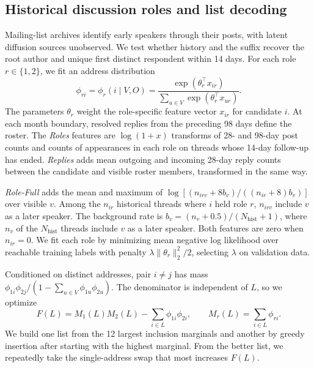 \documentclass[a4paper,runningheads]{llncs}
\begin{document}
\subsection{Historical discussion roles and list decoding}
Mailing-list archives identify early speakers through their posts, with latent diffusion sources unobserved. We test whether history and the suffix recover the root author and unique first distinct respondent within 14 days. For each role $r\in\{1,2\}$, we fit an address distribution
\[
 \phi_{ri}=\phi_r(i\mid V,O)=\frac{\exp(\theta_r^\top x_{ir})}{\sum_{u\in V}\exp(\theta_r^\top x_{ur})}.
\]
The parameters $\theta_r$ weight the role-specific feature vector $x_{ir}$ for candidate $i$. At each month boundary, resolved replies from the preceding 98 days define the roster. The \emph{Roles} features are $\log(1+x)$ transforms of 28- and 98-day post counts and counts of appearances in each role on threads whose 14-day follow-up has ended. \emph{Replies} adds mean outgoing and incoming 28-day reply counts between the candidate and visible roster members, transformed in the same way.

\emph{Role-Full} adds the mean and maximum of $\log[(n_{irv}+8b_v)/((n_{ir}+8)b_v)]$ over visible $v$. Among the $n_{ir}$ historical threads where $i$ held role $r$, $n_{irv}$ include $v$ as a later speaker. The background rate is $b_v=(n_v+0.5)/(N_{\mathrm{hist}}+1)$, where $n_v$ of the $N_{\mathrm{hist}}$ threads include $v$ as a later speaker. Both features are zero when $n_{ir}=0$. We fit each role by minimizing mean negative log likelihood over reachable training labels with penalty $\lambda\|\theta_r\|_2^2/2$, selecting $\lambda$ on validation data.

Conditioned on distinct addresses, pair $i\ne j$ has mass \mbox{$\phi_{1i}\phi_{2j}/(1-\sum_{u\in V}\phi_{1u}\phi_{2u})$}. The denominator is independent of $L$, so we optimize
\[
 F(L)=M_1(L)M_2(L)-\sum_{i\in L}\phi_{1i}\phi_{2i},
 \qquad M_r(L)=\sum_{i\in L}\phi_{ri}.
\]
We build one list from the 12 largest inclusion marginals and another by greedy insertion after starting with the highest marginal. From the better list, we repeatedly take the single-address swap that most increases $F(L)$.
\end{document}

